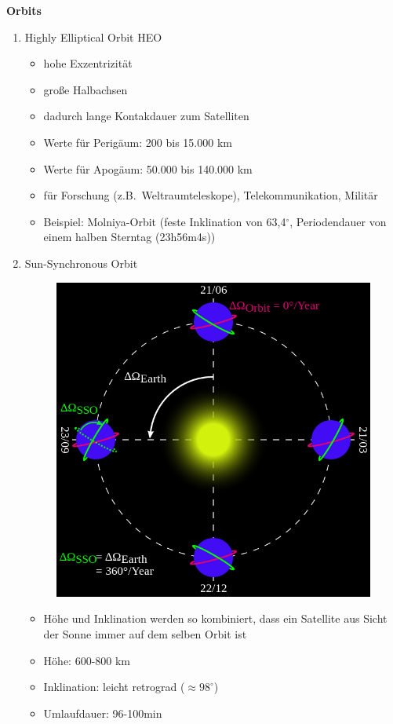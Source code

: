 \documentclass[a4paper,10pt]{article}
\newcommand{\f}{\textbf}
\newcommand{\zb}{z.B.\ }
\begin{document}
\noindent \f{Orbits}
\begin{enumerate}
 \item Highly Elliptical Orbit HEO
 \begin{itemize}
  \item hohe Exzentrizität
  \item große Halbachsen
  \item dadurch lange Kontakdauer zum Satelliten
  \item Werte für Perigäum: 200 bis 15.000 km
  \item Werte für Apogäum: 50.000 bis 140.000 km
  \item für Forschung (\zb Weltraumteleskope), Telekommunikation, Militär 
  \item Beispiel: Molniya-Orbit (feste Inklination von 63,4$^\circ$, Periodendauer von einem halben Sterntag (23h56m4s))
 \end{itemize}
 \item Sun-Synchronous Orbit
 \begin{figure}[!ht]
  \centering
  \includegraphics[scale=0.4]{sso}
 \end{figure}
 \begin{itemize}
  \item Höhe und Inklination werden so kombiniert, dass ein Satellite aus Sicht der Sonne immer auf dem selben Orbit ist
  \item Höhe: 600-800 km
  \item Inklination: leicht retrograd ($\approx 98^\circ$)
  \item Umlaufdauer: 96-100min
 \end{itemize}


\end{enumerate}
\end{document}
